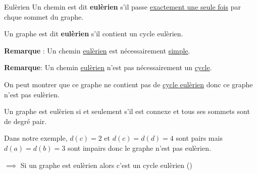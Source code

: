 \begin{Definition}[colbacktitle=red!75!black]{Eulèrien}{}
Un chemin est dit \textbf{eulèrien} s'il passe \underline{exactement une seule fois} par chque sommet du graphe. 

Un graphe est dit \textbf{eulèrien} s'il contient un cycle eulèrien.
\end{Definition}

\textbf{Remarque} : Un chemin \underline{eulèrien} est nécessairement \underline{simple}.

\textbf{Remarque}: Un chemin \underline{eulèrien} n'est pas nécessairement un \underline{cycle}.

On peut montrer que ce graphe ne contient pas de \underline{cycle eulèrien} donc ce graphe n'est pas eulèrien.


\begin{Theorem}{}{}
Un graphe est eulèrien si et seulement s'il est connexe et tous ses sommets sont de degré pair.
\end{Theorem}

\begin{Example}{}{}
Dans notre exemple, $d(c) = 2$ et $d(c) = d(d) = 4$ sont pairs mais $d(a) = d(b) = 3$ sont impairs donc le graphe n'est pas eulèrien.
\end{Example}

\begin{myproof}{}{}
$\implies$ Si un graphe est eulèrien alors c'est un cycle eulèrien ()
\end{myproof}













